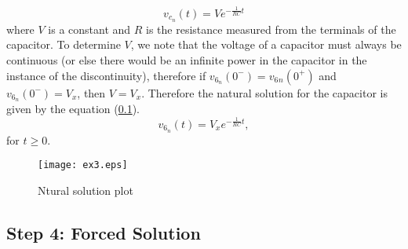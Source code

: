 \begin{equation}
    v_{c_n}(t) = V e^{-\frac{1}{RC}t}
\end{equation}
where $V$ is a constant and $R$ is the resistance measured from the terminals of the capacitor.
To determine $V$, we note that the voltage of a capacitor must always be continuous (or else there would be an infinite power in the capacitor in the instance of the discontinuity), therefore if $v_{6_n}(0^-) = v_6{_n(0^+)}$ and  $v_{6_n}(0^-) = V_x$, then $V = V_x$. 
Therefore the natural solution for the capacitor is given by the equation (\ref{}).
\begin{equation}
    v_{6_n}(t) = V_x e^{-\frac{1}{RC}t}, 
\end{equation}
for $t \geq 0$.

  \begin{figure}[H] \centering
    \texttt{[image: ex3.eps]}
    \caption{Ntural solution plot}
    \label{fig:ex3}
    \end{figure}


\subsection{Step 4: Forced Solution}


